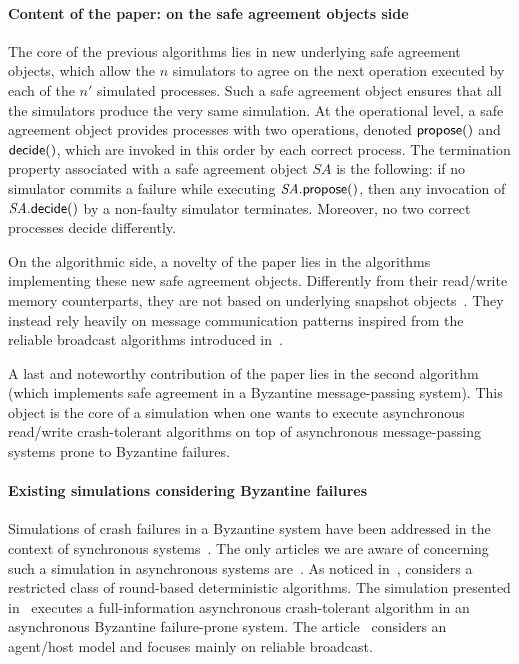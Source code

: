 \documentclass[11pt,letterpaper]{article}
\newcommand{\SA}{\mathit{SA}}
\begin{document}
\paragraph{Content of the paper: on the safe agreement objects side}
The core of the previous algorithms  lies in 
  new  underlying safe agreement objects, which allow the
$n$ simulators to agree on the next operation executed by each of the $n'$
simulated  processes. Such a  safe agreement object ensures that all the
simulators produce the very same simulation. At the operational level,
a safe agreement object
provides processes with two operations, denoted ${\sf propose}()$
and ${\sf decide}()$, which  are invoked in this order by each correct process.
The termination property associated with  a safe agreement object $\SA$ is
the following: if no simulator commits a failure while executing
$\SA.{\sf propose}()$, then any invocation of $\SA.{\sf decide}()$ 
by a non-faulty simulator terminates. Moreover, no two correct processes 
decide differently. 

On the algorithmic side, a novelty of the paper lies in the algorithms
implementing these new safe agreement objects. Differently from their
read/write memory counterparts, they are not based on underlying
snapshot objects~\cite{AADGMS93}.  They instead rely heavily on
message communication patterns inspired from the reliable broadcast
algorithms  introduced in~\cite{B87}.

A last and noteworthy contribution of the paper lies in the second algorithm
(which implements safe agreement in a  Byzantine message-passing system).
This object is the core of a simulation when one wants to execute     
asynchronous read/write crash-tolerant algorithms  on top of asynchronous
message-passing systems prone to Byzantine failures.


\paragraph{Existing simulations considering Byzantine failures}
Simulations of crash failures in a Byzantine system have been
addressed in the context of synchronous systems~\cite{BN91,NT90,ST87}.
The only articles we are aware of concerning such a simulation in
asynchronous systems are~\cite{C88,HKR14,HDR07}.  As noticed
in~\cite{AW04}, \cite{C88} considers a restricted class of round-based
deterministic algorithms.  The
simulation presented in~\cite{HKR14} executes a full-information
asynchronous crash-tolerant algorithm in an asynchronous Byzantine
failure-prone system. The article~\cite{HDR07} considers an
agent/host model and focuses mainly on reliable broadcast. 
\end{document}
